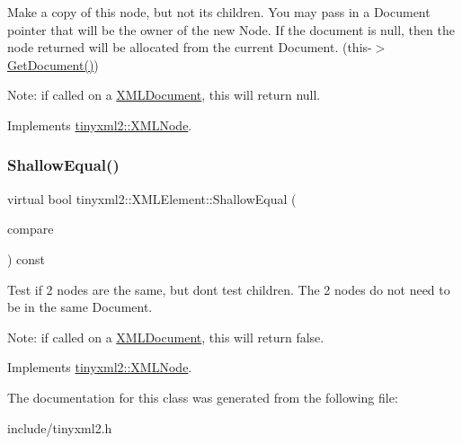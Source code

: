 Make a copy of this node, but not its children. You may pass in a Document pointer that will be the owner of the new Node. If the \textquotesingle{}document\textquotesingle{} is null, then the node returned will be allocated from the current Document. (this-\/$>$\mbox{\hyperlink{classtinyxml2_1_1XMLNode_af343d1ef0b45c0020e62d784d7e67a68}{Get\+Document()}})

Note\+: if called on a \mbox{\hyperlink{classtinyxml2_1_1XMLDocument}{X\+M\+L\+Document}}, this will return null. 

Implements \mbox{\hyperlink{classtinyxml2_1_1XMLNode_a8402cbd3129d20e9e6024bbcc0531283}{tinyxml2\+::\+X\+M\+L\+Node}}.

\mbox{\label{classtinyxml2_1_1XMLElement_ad9ea913a460b48979bd83cf9871c99f6}} 
\subsubsection{\texorpdfstring{ShallowEqual()}{ShallowEqual()}}
{\footnotesize\ttfamily virtual bool tinyxml2\+::\+X\+M\+L\+Element\+::\+Shallow\+Equal (\begin{DoxyParamCaption}\item[{const \mbox{\hyperlink{classtinyxml2_1_1XMLNode}{X\+M\+L\+Node}} $\ast$}]{compare }\end{DoxyParamCaption}) const\hspace{0.3cm}{\ttfamily [virtual]}}

Test if 2 nodes are the same, but don\textquotesingle{}t test children. The 2 nodes do not need to be in the same Document.

Note\+: if called on a \mbox{\hyperlink{classtinyxml2_1_1XMLDocument}{X\+M\+L\+Document}}, this will return false. 

Implements \mbox{\hyperlink{classtinyxml2_1_1XMLNode_a7ce18b751c3ea09eac292dca264f9226}{tinyxml2\+::\+X\+M\+L\+Node}}.



The documentation for this class was generated from the following file\+:\begin{DoxyCompactItemize}
\item 
include/tinyxml2.\+h\end{DoxyCompactItemize}

